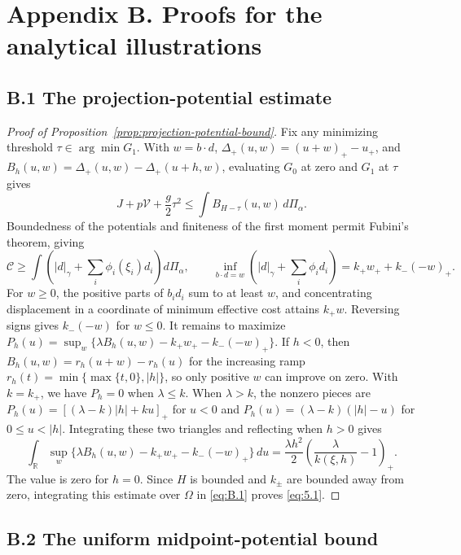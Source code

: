 \section{Appendix B. Proofs for the analytical illustrations}\label{app:illustration-proofs}
\subsection{B.1 The projection-potential estimate}\label{app:potential-proof}
\begin{proof}[Proof of Proposition~\ref{prop:projection-potential-bound}]
Fix any minimizing threshold \(\tau\in\arg\min G_1\). With \(w=b\cdot d\), \(\Delta_+(u,w)=(u+w)_+-u_+\), and \(B_h(u,w)=\Delta_+(u,w)-\Delta_+(u+h,w)\), evaluating \(G_0\) at zero and \(G_1\) at \(\tau\) gives
\begin{equation}
J+p\mathcal V+\frac g2\tau^2
\le\int B_{H-\tau}(u,w)\,d\Pi_\alpha.
\tag{B.1}\label{eq:B.1}
\end{equation}
Boundedness of the potentials and finiteness of the first moment permit Fubini's theorem, giving
\[
\mathcal C\ge\int\left(|d|_\gamma+\sum_i\phi_i(\xi_i)d_i\right)d\Pi_\alpha,
\qquad
\inf_{b\cdot d=w}\left(|d|_\gamma+\sum_i\phi_i d_i\right)
=k_+w_++k_-(-w)_+.
\]
For \(w\ge0\), the positive parts of \(b_id_i\) sum to at least \(w\), and concentrating displacement in a coordinate of minimum effective cost attains \(k_+w\). Reversing signs gives \(k_-(-w)\) for \(w\le0\). It remains to maximize
\(P_h(u)=\sup_w\{\lambda B_h(u,w)-k_+w_+-k_-(-w)_+\}\).
If \(h<0\), then \(B_h(u,w)=r_h(u+w)-r_h(u)\) for the increasing ramp
\(r_h(t)=\min\{\max\{t,0\},|h|\}\), so only positive \(w\) can improve on zero. With \(k=k_+\), we have \(P_h=0\) when \(\lambda\le k\). When \(\lambda>k\), the nonzero pieces are
\(P_h(u)=[(\lambda-k)|h|+ku]_+\) for \(u<0\) and
\(P_h(u)=(\lambda-k)(|h|-u)\) for \(0\le u<|h|\).
Integrating these two triangles and reflecting when \(h>0\) gives
\[
\int_{\mathbb R}\sup_w\{\lambda B_h(u,w)-k_+w_+-k_-(-w)_+\}\,du
=\frac{\lambda h^2}{2}\left(\frac{\lambda}{k(\xi,h)}-1\right)_+.
\]
The value is zero for \(h=0\). Since \(H\) is bounded and \(k_\pm\) are bounded away from zero, integrating this estimate over \(\Omega\) in \eqref{eq:B.1} proves \eqref{eq:5.1}.
\end{proof}

\subsection{B.2 The uniform midpoint-potential bound}\label{app:uniform-bound-proof}

